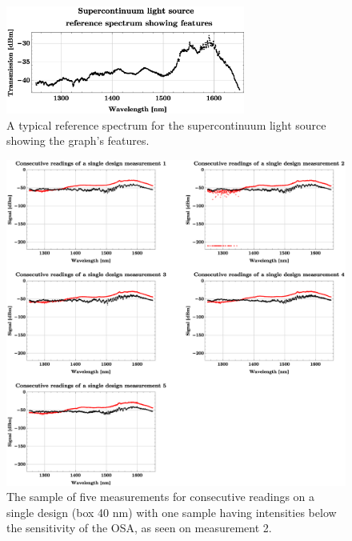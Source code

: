 \vspace{-1.5cm}
\begin{figure}[H]
    \centering
    \includegraphics[width=0.7\textwidth]
    {fig/appendixrefplots/superKrefzoom.eps}
\vspace{-2mm}
    \caption{A typical reference spectrum for the supercontinuum light source showing the graph's features.}
    \label{fig:superKref}
\end{figure}


\begin{figure}[H]
    \centering
    \includegraphics[width=1\textwidth]{fig/appendixrefplots/SignalPlots.eps}
    \caption{The sample of five measurements for consecutive readings on a single design (box 40 nm) with one sample having intensities below the sensitivity of the OSA, as seen on measurement 2.}
    \label{fig:ConsecutiveFiveBox40}
\end{figure}


